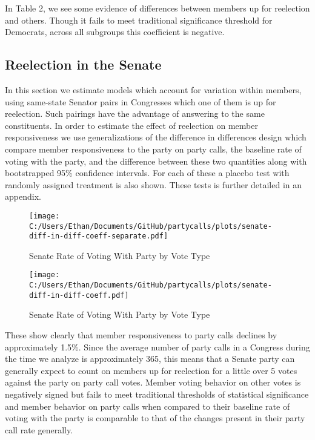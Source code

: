 \documentclass[12pt]{article}
\begin{document}
In Table 2, we see some evidence of differences between members up for reelection and others. Though it fails to meet traditional significance threshold for Democrats, across all subgroups this coefficient is negative. 

\subsection{Reelection in the Senate}

In this section we estimate models which account for variation within members, using same-state Senator pairs in Congresses which one of them is up for reelection. Such pairings have the advantage of answering to the same constituents. In order to estimate the effect of reelection on member responsiveness we use generalizations of the difference in differences design which compare member responsiveness to the party on party calls, the baseline rate of voting with the party, and the difference between these two quantities along with bootstrapped 95\% confidence intervals. For each of these a placebo test with randomly assigned treatment is also shown. These tests is further detailed in an appendix.

\begin{figure}[H]
	\centering
	\caption{Senate Rate of Voting With Party by Vote Type}
	\texttt{[image: C:/Users/Ethan/Documents/GitHub/partycalls/plots/senate-diff-in-diff-coeff-separate.pdf]}
\end{figure}

\begin{figure}[H]
	\centering
	\caption{Senate Rate of Voting With Party by Vote Type}
	\texttt{[image: C:/Users/Ethan/Documents/GitHub/partycalls/plots/senate-diff-in-diff-coeff.pdf]}
\end{figure}

These show clearly that member responsiveness to party calls declines by approximately 1.5\%. Since the average number of party calls in a Congress during the time we analyze is approximately 365, this means that a Senate party can generally expect to count on members up for reelection for a little over 5 votes against the party on party call votes. Member voting behavior on other votes is negatively signed but fails to meet traditional thresholds of statistical significance and member behavior on party calls when compared to their baseline rate of voting with the party is comparable to that of the changes present in their party call rate generally.
\end{document}
